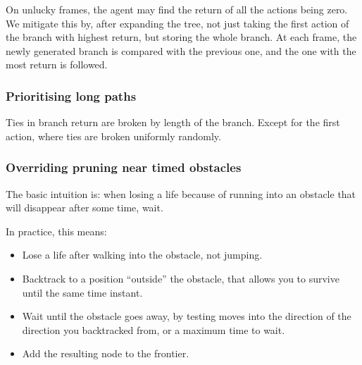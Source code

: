 On unlucky frames, the agent may find the return of all the actions being zero.
We mitigate this by, after expanding the tree, not just taking the first action
of the branch with highest return, but storing the whole branch. At each frame,
the newly generated branch is compared with the previous one, and the one with
the most return is followed.

\subsubsection{Prioritising long paths}
Ties in branch return are broken by length of the branch. Except for the first
action, where ties are broken uniformly randomly.

\subsubsection{Overriding pruning near timed obstacles}
The basic intuition is: when losing a life because of running into an obstacle
that will disappear after some time, wait.

In practice, this means:
\begin{itemize}
  \item Lose a life after walking into the obstacle, not jumping.
  \item Backtrack to a position ``outside'' the obstacle, that allows you to
    survive until the same time instant.
  \item Wait until the obstacle goes away, by testing moves into the direction
    of the direction you backtracked from, or a maximum time to wait.
  \item Add the resulting node to the frontier.
\end{itemize}

